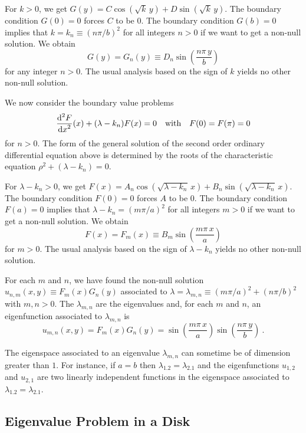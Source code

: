 For $k>0$, we get
$\displaystyle G(y) = C \cos(\sqrt{k}\,y) + D \sin(\sqrt{k} \,y)$.
The boundary condition $G(0)=0$ forces $C$ to be $0$.  The boundary
condition $G(b) = 0$ implies that
$\displaystyle k = k_n \equiv \left(n\pi/b\right)^2$ for all integers $n>0$
if we want to get a non-null solution.
We obtain
\[
G(y) = G_n(y) \equiv D_n \sin\left( \frac{n\pi\, y}{b}\right)
\]
for any integer $n>0$.  The usual analysis based on the sign of
$k$ yields no other non-null solution.

We now consider the boundary value problems
\begin{equation} \label{laplace_e_eigenC3}
\frac{\displaystyle \mathrm{d}^{2}{F}} {\displaystyle \mathrm{d}{x}^{2}}(x) + (\lambda-k_n) F(x) = 0 \quad \text{with}
\quad F(0)=F(\pi)=0
\end{equation}
for $n>0$.  The form of the general solution
of the second order ordinary differential equation above is determined by the roots of the
characteristic equation $\rho^2 +(\lambda-k_n)=0$.

For $\lambda-k_n>0$, we get
$\displaystyle F(x) = A_n \cos(\sqrt{\lambda-k_n}\, x) + B_n
\sin(\sqrt{\lambda-k_n}\,x)$.
The boundary condition $F(0)=0$ forces $A$ to be $0$.  The boundary
condition $F(a) = 0$ implies that
$\displaystyle \lambda - k_n = \left(m\pi/a\right)^2$ for
all integers $m>0$ if we want to get a non-null solution.  We obtain
\[
F(x) = F_m(x) \equiv B_m \sin\left(\frac{m\pi\,x}{a}\right)
\]
for $m>0$.  The usual analysis based on the sign of
$\lambda - k_n$ yields no other non-null solution.

For each $m$ and $n$, we have found the non-null solution
$u_{n,m}(x,y) \equiv F_m(x)G_n(y)$ associated to
$\displaystyle \lambda = \lambda_{m,n} \equiv \left(m\pi/a\right)^2 +
\left(n\pi/b\right)^2$ with $m,n > 0$.  The $\lambda_{m,n}$
are the eigenvalues and, for each $m$ and $n$, an eigenfunction
associated to $\lambda_{m,n}$ is
\[
u_{m,n}(x,y) = F_m(x)G_n(y) = \sin\left(\frac{m\pi\,x}{a}\right)
\sin\left( \frac{n\pi\, y}{b}\right) \ .
\]

\begin{rmk}
The eigenspace associated to an eigenvalue $\lambda_{m,n}$ can
sometime be of dimension greater than $1$.  For instance, if $a=b$
then $\lambda_{1.2} = \lambda_{2.1}$ and the eigenfunctions
$u_{1,2}$ and $u_{2,1}$ are two linearly independent functions in the
eigenspace associated to $\lambda_{1.2} = \lambda_{2.1}$.
\end{rmk}

\subsection{Eigenvalue Problem in a Disk}

